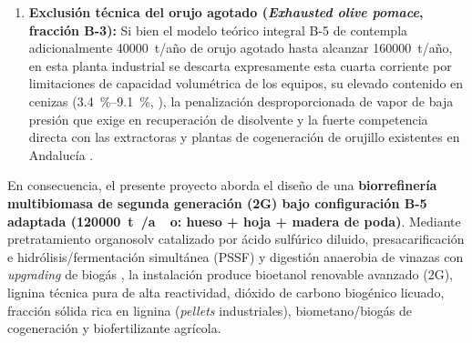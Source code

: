 \documentclass{report}
\begin{document}
\begin{enumerate}
    \item \textbf{Exclusión técnica del orujo agotado (\textit{Exhausted olive pomace}, fracción B-3):} Si bien el modelo teórico integral B-5 de \textcite[Tabla~6 y Tabla~8]{Jafari-Gohargan2026} contempla adicionalmente \num{40000}~t/año de orujo agotado hasta alcanzar \num{160000}~t/año, en esta planta industrial se descarta expresamente esta cuarta corriente por limitaciones de capacidad volumétrica de los equipos, su elevado contenido en cenizas (\SI{3.4}{\percent}--\SI{9.1}{\percent}, \textcite[Tabla~1]{MoranAlarcon2026}), la penalización desproporcionada de vapor de baja presión que exige en recuperación de disolvente \autocite[Tabla~8]{Jafari-Gohargan2026} y la fuerte competencia directa con las extractoras y plantas de cogeneración de orujillo existentes en Andalucía \autocite[Sección~4.2.3]{APPA2026}.
\end{enumerate}

En consecuencia, el presente proyecto aborda el diseño de una \textbf{biorrefinería multibiomasa de segunda generación (2G) bajo configuración B-5 adaptada (\SI{120000}{\tonne{}/ao}: hueso + hoja + madera de poda)}. Mediante pretratamiento organosolv catalizado por ácido sulfúrico diluido, presacarificación e hidrólisis/fermentación simultánea (PSSF) y digestión anaerobia de vinazas con \textit{upgrading} de biogás \autocite[Fig.~1]{Jafari-Gohargan2026, Padilla-Rascon2022}, la instalación produce bioetanol renovable avanzado (2G), lignina técnica pura de alta reactividad, dióxido de carbono biogénico licuado, fracción sólida rica en lignina (\textit{pellets} industriales), biometano/biogás de cogeneración y biofertilizante agrícola.
\end{document}
